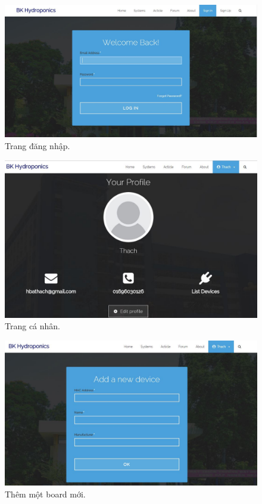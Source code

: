 \documentclass[a4paper,12pt,oneside]{article}
\begin{document}
\begin{center}
\begin{figure}[H]
\begin{center}
\includegraphics[scale=.5]{hinh/web_login.jpg}
\end{center}
\caption{Trang đăng nhập.}
\end{figure}

\begin{figure}[H]
\begin{center}
\includegraphics[scale=.6]{hinh/web_profile.jpg}
\end{center}
\caption{Trang cá nhân.}
\end{figure}

\begin{figure}[H]
\begin{center}
\includegraphics[scale=.5]{hinh/web_add_device.jpg}
\end{center}
\caption{Thêm một board mới.}
\end{figure}


\end{center}
\end{document}
